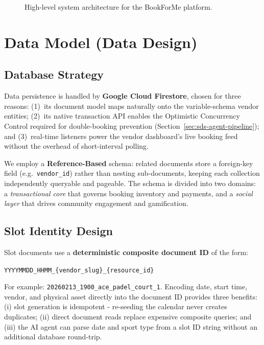 \begin{figure}[H]
    \centering
    \caption{High-level system architecture for the BookForMe platform.}
    \label{fig:sds-system-arch}
\end{figure}

\section{Data Model (Data Design)}
\label{sec:sds-data}

\subsection{Database Strategy}
Data persistence is handled by \textbf{Google Cloud Firestore}, chosen for three reasons:
(1)~its document model maps naturally onto the variable-schema vendor entities;
(2)~its native transaction API enables the Optimistic Concurrency Control required
for double-booking prevention (Section~\ref{sec:sds-agent-pipeline}); and
(3)~real-time listeners power the vendor dashboard's live booking feed without the
overhead of short-interval polling.

We employ a \textbf{Reference-Based} schema: related documents store a foreign-key
field (e.g.\ \texttt{vendor\_id}) rather than nesting sub-documents, keeping each
collection independently queryable and pageable. The schema is divided into two
domains: a \emph{transactional core} that governs booking inventory and payments, and
a \emph{social layer} that drives community engagement and gamification.

\subsection{Slot Identity Design}
Slot documents use a \textbf{deterministic composite document ID} of the form:

\begin{center}
\texttt{YYYYMMDD\_HHMM\_\{vendor\_slug\}\_\{resource\_id\}}
\end{center}

\noindent For example: \texttt{20260213\_1900\_ace\_padel\_court\_1}. Encoding date,
start time, vendor, and physical asset directly into the document ID provides three
benefits: (i) slot generation is idempotent - re-seeding the calendar never
creates duplicates; (ii) direct document reads replace expensive composite queries;
and (iii) the AI agent can parse date and sport type from a slot ID string without
an additional database round-trip.

